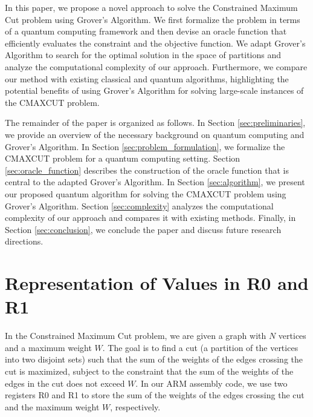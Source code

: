 In this paper, we propose a novel approach to solve the Constrained Maximum Cut problem using Grover's Algorithm. We first formalize the problem in terms of a quantum computing framework and then devise an oracle function that efficiently evaluates the constraint and the objective function. We adapt Grover's Algorithm to search for the optimal solution in the space of partitions and analyze the computational complexity of our approach. Furthermore, we compare our method with existing classical and quantum algorithms, highlighting the potential benefits of using Grover's Algorithm for solving large-scale instances of the CMAXCUT problem.

The remainder of the paper is organized as follows. In Section \ref{sec:preliminaries}, we provide an overview of the necessary background on quantum computing and Grover's Algorithm. In Section \ref{sec:problem_formulation}, we formalize the CMAXCUT problem for a quantum computing setting. Section \ref{sec:oracle_function} describes the construction of the oracle function that is central to the adapted Grover's Algorithm. In Section \ref{sec:algorithm}, we present our proposed quantum algorithm for solving the CMAXCUT problem using Grover's Algorithm. Section \ref{sec:complexity} analyzes the computational complexity of our approach and compares it with existing methods. Finally, in Section \ref{sec:conclusion}, we conclude the paper and discuss future research directions.


\section{Representation of Values in R0 and R1}

In the Constrained Maximum Cut problem, we are given a graph with $N$ vertices and a maximum weight $W$. The goal is to find a cut (a partition of the vertices into two disjoint sets) such that the sum of the weights of the edges crossing the cut is maximized, subject to the constraint that the sum of the weights of the edges in the cut does not exceed $W$. In our ARM assembly code, we use two registers R0 and R1 to store the sum of the weights of the edges crossing the cut and the maximum weight $W$, respectively.

